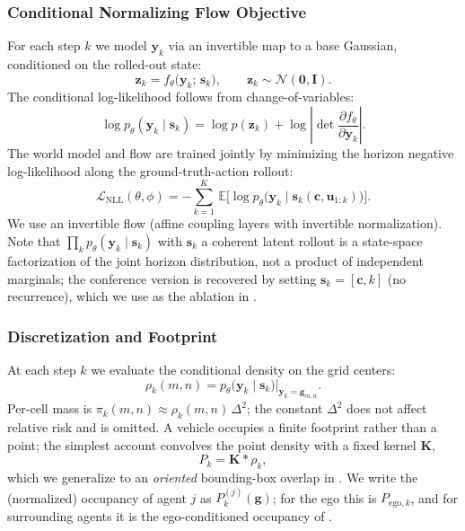 \documentclass[journal]{IEEEtran}
\begin{document}
\subsubsection{Conditional Normalizing Flow Objective}\label{sec:flow_objective}
For each step $k$ we model $\mathbf{y}_k$ via an invertible map to a base Gaussian, conditioned on the rolled-out state:
\begin{equation}
\mathbf{z}_k=f_{\theta}\big(\mathbf{y}_k;\,\mathbf{s}_k\big),\qquad \mathbf{z}_k\sim\mathcal{N}(\mathbf{0},\mathbf{I}).
\label{eq:flow_forward}
\end{equation}
The conditional log-likelihood follows from change-of-variables:
\begin{equation}
\log p_{\theta}(\mathbf{y}_k\mid\mathbf{s}_k)=\log p(\mathbf{z}_k)+\log\left|\det\frac{\partial f_{\theta}}{\partial \mathbf{y}_k}\right|.
\label{eq:change_of_variables}
\end{equation}
The world model and flow are trained jointly by minimizing the horizon negative log-likelihood along the ground-truth-action rollout:
\begin{equation}
\mathcal{L}_{\mathrm{NLL}}(\theta,\phi)=-\sum_{k=1}^{K}\,\mathbb{E}\big[\log p_{\theta}\big(\mathbf{y}_k\mid \mathbf{s}_k(\mathbf{c},\mathbf{u}_{1:k})\big)\big].
\label{eq:nll}
\end{equation}
We use an invertible flow (affine coupling layers with invertible normalization). Note that $\prod_{k} p_{\theta}(\mathbf{y}_k\mid\mathbf{s}_k)$ with $\mathbf{s}_k$ a coherent latent rollout is a state-space factorization of the joint horizon distribution, not a product of independent marginals; the conference version is recovered by setting $\mathbf{s}_k\!=\![\mathbf{c},k]$ (no recurrence), which we use as the ablation in .

\subsubsection{Discretization and Footprint}\label{sec:grid_discretization}
At each step $k$ we evaluate the conditional density on the grid centers:
\begin{equation}
\rho_k(m,n)=p_{\theta}\big(\mathbf{y}_k\mid\mathbf{s}_k\big)\big|_{\mathbf{y}_k=\mathbf{g}_{m,n}}.
\label{eq:rho_grid}
\end{equation}
Per-cell mass is $\pi_k(m,n)\approx\rho_k(m,n)\,\Delta^2$; the constant $\Delta^2$ does not affect relative risk and is omitted. A vehicle occupies a finite footprint rather than a point; the simplest account convolves the point density with a fixed kernel $\mathbf{K}$,
\begin{equation}
P_k=\mathbf{K}\ast\rho_k,
\label{eq:kernel_dilation}
\end{equation}
which we generalize to an \emph{oriented} bounding-box overlap in . We write the (normalized) occupancy of agent $j$ as $P^{(j)}_{k}(\mathbf{g})$; for the ego this is $P_{\mathrm{ego},k}$, and for surrounding agents it is the ego-conditioned occupancy of .
\end{document}
